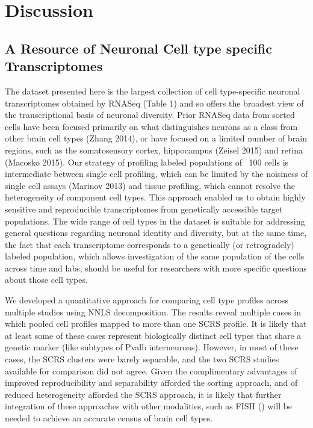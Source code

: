 
\section{Discussion}

\subsection{A Resource of Neuronal Cell type specific Transcriptomes}
The dataset presented here is the largest collection of cell type-specific neuronal transcriptomes obtained by RNASeq (Table 1) and so offers the broadest view of the transcriptional basis of neuronal diversity. Prior RNASeq data from sorted cells have been focused primarily on what distinguishes neurons as a class from other brain cell types (Zhang 2014), or have focused on a limited number of brain regions, such as the somatosensory cortex, hippocampus (Zeisel 2015) and retina (Macosko 2015). Our strategy of profiling labeled populations of ~100 cells is intermediate between single cell profiling, which can be limited by the noisiness of single cell assays (Marinov 2013) and tissue profiling, which cannot resolve the heterogeneity of component cell types. This approach enabled us to obtain highly sensitive and reproducible transcriptomes from genetically accessible target populations. The wide range of cell types in the dataset is suitable for addressing general questions regarding neuronal identity and diversity, but at the same time, the fact that each transcriptome corresponds to a genetically (or retrogradely) labeled population, which allows investigation of the same population of the cells across time and labs, should be useful for researchers with more specific questions about those cell types.

We developed a quantitative approach for comparing cell type profiles across multiple studies using NNLS decomposition. The results reveal multiple cases in which pooled cell profiles mapped to more than one SCRS profile. It is likely that at least some of these cases represent biologically distinct cell types that share a genetic marker (like subtypes of Pvalb interneurons). However, in most of these cases, the SCRS clusters were barely separable, and the two SCRS studies available for comparison did not agree. Given the complimentary advantages of improved reproducibility and separability afforded the sorting approach, and of reduced heterogeneity afforded the SCRS approach, it is likely that further integration of these approaches with other modalities, such as FISH () will be needed to achieve an accurate census of brain cell types. 

